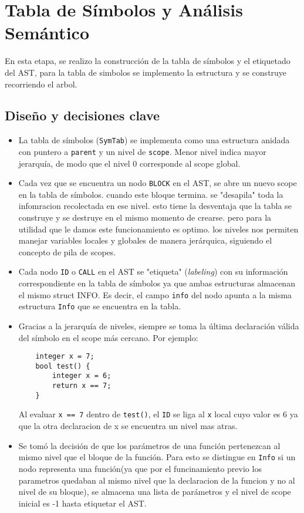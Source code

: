 \documentclass[12pt,a4paper]{article}
\begin{document}
\section{Tabla de Símbolos y Análisis Semántico}

En esta etapa, se realizo la construcción de la tabla de símbolos y el etiquetado del AST, para la tabla de simbolos se implemento la estructura y se construye recorriendo el arbol.

\subsection{Diseño y decisiones clave}
\begin{itemize}
    \item La tabla de símbolos (\texttt{SymTab}) se implementa como una estructura anidada con puntero a \texttt{parent} y un nivel de \texttt{scope}.  
    Menor nivel indica mayor jerarquía, de modo que el nivel 0 corresponde al scope global.
    \item Cada vez que se encuentra un nodo \texttt{BLOCK} en el AST, se abre un nuevo scope en la tabla de símbolos. cuando este bloque termina. se "desapila" toda la infomracion recolectada en ese nivel. esto tiene la desventaja que la tabla se construye y se destruye en el mismo momento de crearse. pero para la utilidad que le damos este funcionamiento es optimo.  
    los niveles nos permiten manejar variables locales y globales de manera jerárquica, siguiendo el concepto de pila de scopes.
    \item Cada nodo \texttt{ID} o \texttt{CALL} en el AST se "etiqueta" (\textit{labeling}) con su información correspondiente en la tabla de símbolos ya que ambas estructuras almacenan el mismo struct INFO.   
    Es decir, el campo \texttt{info} del nodo apunta a la misma estructura \texttt{Info} que se encuentra en la tabla.
    \item Gracias a la jerarquía de niveles, siempre se toma la última declaración válida del símbolo en el scope más cercano. Por ejemplo:
    \begin{verbatim}
    integer x = 7;
    bool test() {
        integer x = 6;
        return x == 7;
    }
    \end{verbatim}
    Al evaluar \texttt{x == 7} dentro de \texttt{test()}, el \texttt{ID} se liga al \texttt{x} local cuyo valor es 6 ya que la otra declaracion de x se encuentra un nivel mas atras.
    \item Se tomó la decisión de que los parámetros de una función pertenezcan al mismo nivel que el bloque de la función.  
    Para esto se distingue en \texttt{Info} si un nodo representa una función(ya que por el funcinamiento previo los parametros quedaban al mismo nivel que la declaracion de la funcion y no al nivel de su bloque), se almacena una lista de parámetros y el nivel de scope inicial es -1 hasta etiquetar el AST.
\end{itemize}
\end{document}
